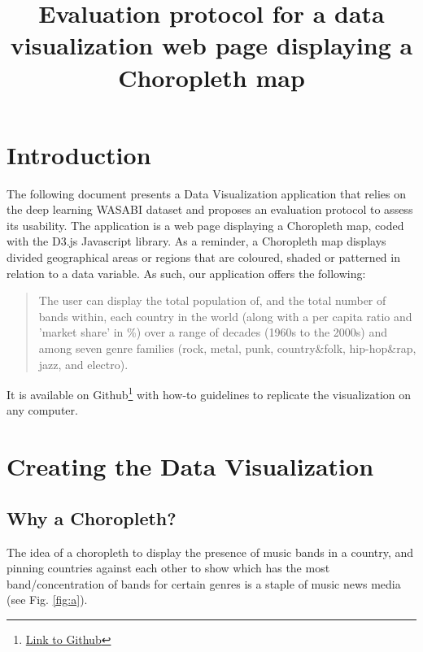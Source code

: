 \documentclass[twocolumn, letterpaper,13pt]{scrartcl}
\begin{document}
    \title{\color{seablue}Evaluation protocol for a data visualization web page displaying a Choropleth map}

	\maketitle
	
    \section*{Introduction}
    
    The following document presents a Data Visualization application that relies on the deep learning WASABI dataset and proposes an evaluation protocol to assess its usability.
    \newline\newline
    The application is a web page displaying a Choropleth map, coded with the D3.js Javascript library. 
    \newline\newline
    As a reminder, a Choropleth map displays divided geographical areas or regions that are coloured, shaded or patterned in relation to a data variable. As such, our application offers the following:
    \begin{quote}
        The user can display the total population of, and the total number of bands within, each country in the world (along with a per capita ratio and 'market share' in \%) over a range of decades (1960s to the 2000s) and among seven genre families (rock, metal, punk, country\&folk, hip-hop\&rap, jazz, and electro).
    \end{quote}
    It is available on Github\footnote{\href{https://github.com/LMquentinLR/choropleth\_wasabi\_dataset}{Link to Github}} with how-to guidelines to replicate the visualization on any computer.
    
    \section{Creating the Data Visualization}
    
    \subsection{Why a Choropleth?}
    
    The idea of a choropleth to display the presence of music bands in a country, and pinning countries against each other to show which has the most band/concentration of bands for certain genres is a staple of music news media (see Fig. \ref{fig:a}).
    
\end{document}
